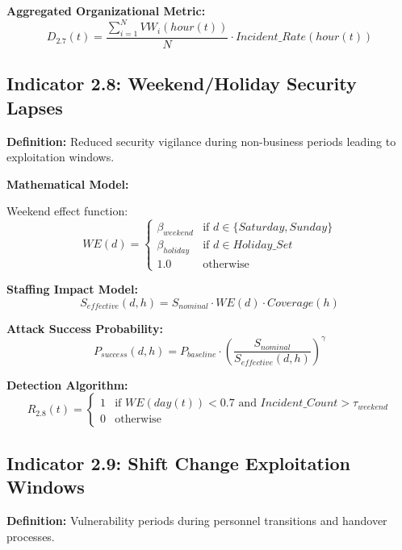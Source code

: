 \documentclass[11pt,a4paper]{article}
\begin{document}
\textbf{Aggregated Organizational Metric:}
\begin{equation}
D_{2.7}(t) = \frac{\sum_{i=1}^{N} VW_i(hour(t))}{N} \cdot Incident\_Rate(hour(t))
\end{equation}

\subsection{Indicator 2.8: Weekend/Holiday Security Lapses}

\textbf{Definition:} Reduced security vigilance during non-business periods leading to exploitation windows.

\textbf{Mathematical Model:}

Weekend effect function:
\begin{equation}
WE(d) = \begin{cases}
\beta_{weekend} & \text{if } d \in \{Saturday, Sunday\} \\
\beta_{holiday} & \text{if } d \in Holiday\_Set \\
1.0 & \text{otherwise}
\end{cases}
\end{equation}

\textbf{Staffing Impact Model:}
\begin{equation}
S_{effective}(d,h) = S_{nominal} \cdot WE(d) \cdot Coverage(h)
\end{equation}

\textbf{Attack Success Probability:}
\begin{equation}
P_{success}(d,h) = P_{baseline} \cdot \left(\frac{S_{nominal}}{S_{effective}(d,h)}\right)^{\gamma}
\end{equation}

\textbf{Detection Algorithm:}
\begin{equation}
R_{2.8}(t) = \begin{cases}
1 & \text{if } WE(day(t)) < 0.7 \text{ and } Incident\_Count > \tau_{weekend} \\
0 & \text{otherwise}
\end{cases}
\end{equation}

\subsection{Indicator 2.9: Shift Change Exploitation Windows}

\textbf{Definition:} Vulnerability periods during personnel transitions and handover processes.
\end{document}
